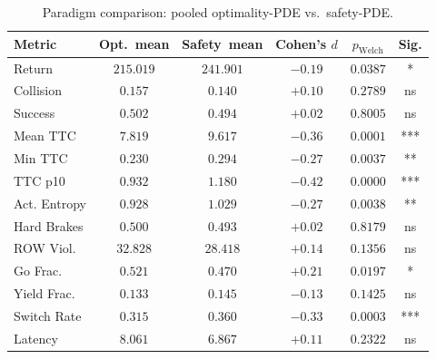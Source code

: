 \begin{table}[ht]
\centering
\caption{Paradigm comparison: pooled optimality-PDE vs.\ safety-PDE.}
\label{tab:paradigm_comparison}
\begin{tabular}{lccccc}
\toprule
Metric & Opt.~mean & Safety~mean & Cohen's $d$ & $p_{\mathrm{Welch}}$ & Sig. \\
\midrule
Return & $215.019$ & $241.901$ & $-0.19$ & $0.0387$ & * \\
Collision & $0.157$ & $0.140$ & $+0.10$ & $0.2789$ & ns \\
Success & $0.502$ & $0.494$ & $+0.02$ & $0.8005$ & ns \\
Mean TTC & $7.819$ & $9.617$ & $-0.36$ & $0.0001$ & *** \\
Min TTC & $0.230$ & $0.294$ & $-0.27$ & $0.0037$ & ** \\
TTC p10 & $0.932$ & $1.180$ & $-0.42$ & $0.0000$ & *** \\
Act. Entropy & $0.928$ & $1.029$ & $-0.27$ & $0.0038$ & ** \\
Hard Brakes & $0.500$ & $0.493$ & $+0.02$ & $0.8179$ & ns \\
ROW Viol. & $32.828$ & $28.418$ & $+0.14$ & $0.1356$ & ns \\
Go Frac. & $0.521$ & $0.470$ & $+0.21$ & $0.0197$ & * \\
Yield Frac. & $0.133$ & $0.145$ & $-0.13$ & $0.1425$ & ns \\
Switch Rate & $0.315$ & $0.360$ & $-0.33$ & $0.0003$ & *** \\
Latency & $8.061$ & $6.867$ & $+0.11$ & $0.2322$ & ns \\
\bottomrule
\end{tabular}
\end{table}
